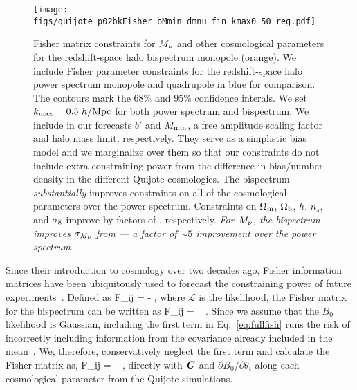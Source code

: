 \begin{figure}
\begin{center}
    \texttt{[image: figs/quijote\_p02bkFisher\_bMmin\_dmnu\_fin\_kmax0\_50\_reg.pdf]} 
    \caption{Fisher matrix constraints for $M_\nu$ and other cosmological parameters 
        for the redshift-space halo bispectrum monopole (orange). We include Fisher
        parameter constraints for the redshift-space halo power spectrum monopole and 
        quadrupole in blue for comparison. The contours mark the $68\%$ and $95\%$ 
        confidence interals.  We set $k_{\rm max} = 0.5~h/{\rm Mpc}$ for both power 
        spectrum and bispectrum. We include in our forecasts $b'$ and $M_{\rm min}$, a 
        free amplitude scaling factor and halo mass limit, respectively. They serve as 
        a simplistic bias model and we marginalize over them so that our constraints do 
        not include extra constraining power from the difference in bias/number density 
        in the different Quijote cosmologies. The bispectrum {\em substantially} 
        improves constraints on all of the cosmological parameters over the power 
        spectrum. Constraints on $\Omega_{\rm m}$, $\Omega_{\rm b}$, $h$, $n_s$, and $\sigma_8$ improve by
        factors of , respectively. {\em For $M_\nu$, the
        bispectrum improves $\sigma_{M_\nu}$ from  --- a factor 
        of ${\sim}5$ improvement over the power spectrum}.}
\label{fig:bk_fish_05}
\end{center}
\end{figure}

Since their introduction to cosmology over two decades ago, Fisher information 
matrices have been ubiquitously used to forecast the constraining power of future 
experiments~\citep[\emph{e.g.}][]{jungman1996,tegmark1997,dodelson2003,heavens2009,verde2010}. 
Defined as 
\beq 
F_{ij} = - \bigg \langle {} \bigg \rangle,
\eeq
where $\mathcal{L}$ is the likelihood, the Fisher matrix for the bispectrum can 
be written as 
\beq \label{eq:fullfish} 
F_{ij} = ~ .
\eeq
Since we assume that the $B_0$ likelihood is Gaussian, including the first 
term in Eq.~\ref{eq:fullfish} runs the risk of incorrectly including information 
from the covariance already included in the mean~\citep{carron2013}. We, therefore,
conservatively neglect the first term and calculate the Fisher matrix as, 
\beq \label{eq:fisher}
F_{ij} = ~ ,
\eeq
directly with $\textbf{\textit{C}}$ and $\partial B_0/\partial \theta_i$ along each cosmological 
parameter from the Quijote simulations. 

